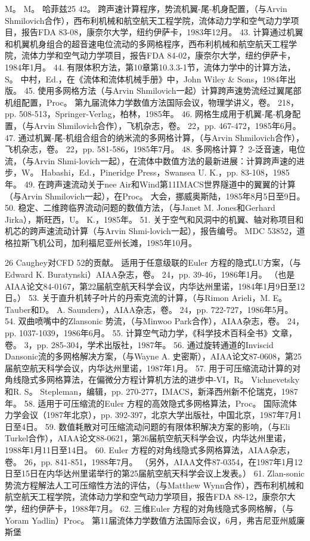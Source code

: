 \documentclass[UTF8,11pt,a4paper,openany,fontset=fandol]{ctexbook}
\begin{document}
M。 M。 哈菲兹25 42。 跨声速计算程序，势流机翼-尾-机身配置，（与Arvin Shmilovich合作），西布利机械和航空航天工程学院，流体动力学和空气动力学项目，报告FDA 83-08，康奈尔大学，纽约伊萨卡，1983年12月。 43. 计算通过机翼和机翼机身组合的超音速电位流动的多网格程序，西布利机械和航空航天工程学院，流体力学和空气动力学项目，报告FDA 84-02，康奈尔大学，纽约伊萨卡，1984年1月。 44. 有限体积方法，第10章第10.3.3-1节，流体力学中的计算方法，S。 中村，Ed.，在《流体和流体机械手册》中，John Wiley \& Sons，1984年出版。 45. 使用多网格方法（与Arvin Shmilovich一起）计算跨声速势流经过翼尾部机组配置，Proc。 第九届流体力学数值方法国际会议，物理学讲义，卷。 218，pp. 508-513，Springer-Verlag，柏林，1985年。 46. 网格生成用于机翼-尾-机身配置，（与Arvin Shmilovich合作），飞机杂志，卷。 22，pp. 467-472，1985年6月。 47. 通过机翼-尾-机组合组合的纳米流的多网格计算，（与Arvin Shmilovich合作），飞机杂志，卷。 22，pp. 581-586，1985年7月。 48. 多网格计算？ 2-泛音速，电位流，（与Arvin Shmi-lovich一起），在流体中数值方法的最新进展：计算跨声速的进步，W。 Habashi，Ed.，Pineridge Press，Swansea U. K.，pp. 83-108，1985年。 49. 在跨声速流动关于nee Air和Wind第11IMACS世界隧道中的翼翼的计算（与Arvin Shmilovich一起），在Proc。 大会，挪威奥斯陆，1985年8月5日至9日。 50. 稳定、二维跨临界流动问题的数值方法，（与Janet M. Jones和Gerhard Jirka），斯旺西，U。 K.，1985年。 51. 关于空气和风洞中的机翼、轴对称项目和机芯的跨声速流动计算（与Arvin Shmi-lovich一起），报告编号。 MDC 53852，道格拉斯飞机公司，加利福尼亚州长滩，1985年10月。

26 Caughey对CFD 52的贡献。 适用于任意级联的Euler 方程的隐式LU方案，（与Edward K. Buratynski）AIAA杂志，卷。 24，pp. 39-46，1986年1月。 （也是AIAA论文84-0167，第22届航空航天科学会议，内华达州里诺，1984年1月9日至12日。） 53. 关于直升机转子叶片的丹索克流的计算，（与Rimon Arieli，M. E。 Tauber和D。 A. Saunders），AIAA杂志，卷。 24，pp. 722-727，1986年5月。 54. 双曲喷嘴中的Zlansonic 势流，（与Minwoo Park合作），AIAA杂志，卷。 24，pp. 1037-1039，1986年6月。 55. 计算空气动力学，《科学技术百科全书》文章，卷。 3，pp. 285-304，学术出版社，1987年。 56. 通过旋转通道的Inviscid Dansonic流的多网格解决方案，（与Wayne A. 史密斯），AIAA论文87-0608，第25届航空航天科学会议，内华达州里诺，1987年1月。 57. 用于可压缩流动计算的对角线隐式多网格算法，在偏微分方程计算机方法的进步中-VI，R。 Vichnevetsky和R. S。 Stepleman，编辑，pp. 270-277，IMACS，新泽西州新不伦瑞克，1987年。 58. 适用于可压缩流的Euler 方程的高效隐式多网格算法，Proc。 国际流体力学会议（1987年北京），pp. 392-397，北京大学出版社，中国北京，1987年7月1日至4日。 59. 数值耗散对可压缩流动问题的有限体积解决方案的影响，（与Eli Turkel合作），AIAA论文88-0621，第26届航空航天科学会议，内华达州里诺，1988年1月11日至14日。 60. Euler 方程的对角线隐式多网格算法，AIAA杂志，卷。 26，pp. 841-851，1988年7月。 （另外，AIAA文件87-0354，在1987年1月12日至15日在内华达州里诺举行的第25届航空航天科学会议上发表。） 61. Zlan-sonic 势流方程解法人工可压缩性方法的评估，（与Matthew Wynn合作），西布利机械和航空航天工程学院，流体动力学和空气动力学项目，报告FDA 88-12，康奈尔大学，纽约伊萨卡，1988年7月。 62. 三维Euler 方程的对角线隐式多网格解，（与Yoram Yadlin）Proc。 第11届流体力学数值方法国际会议，6月，弗吉尼亚州威廉斯堡
\end{document}

